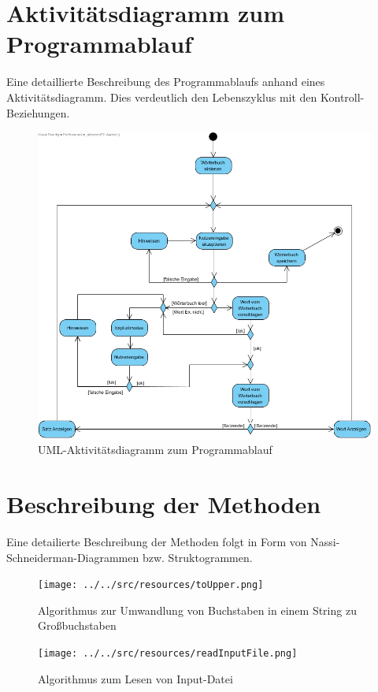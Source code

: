 \section{Aktivitätsdiagramm zum Programmablauf}
Eine detaillierte Beschreibung des Programmablaufs anhand eines Aktivitätsdiagramm. Dies verdeutlich den Lebenszyklus mit den Kontroll-Beziehungen.
\begin{figure}[H]
\centering
\includegraphics[width=1.\columnwidth]{images/activitydiagramm.jpg}
\caption[UML-Sequenzdiagramm]{UML-Aktivitätsdiagramm zum Programmablauf}
\end{figure}

\section{Beschreibung der Methoden}
Eine detailierte Beschreibung der Methoden folgt in Form von Nassi-Schneiderman-Diagrammen bzw. Struktogrammen.

\begin{figure}[!ht]
\centering
\texttt{[image: ../../src/resources/toUpper.png]}
\caption[UML-Klassendiagramm]{Algorithmus zur Umwandlung von Buchstaben in einem String zu Großbuchstaben}
\end{figure}

\begin{figure}[!ht]
\centering
\texttt{[image: ../../src/resources/readInputFile.png]}
\caption[UML-Klassendiagramm]{Algorithmus zum Lesen von Input-Datei}
\end{figure}
